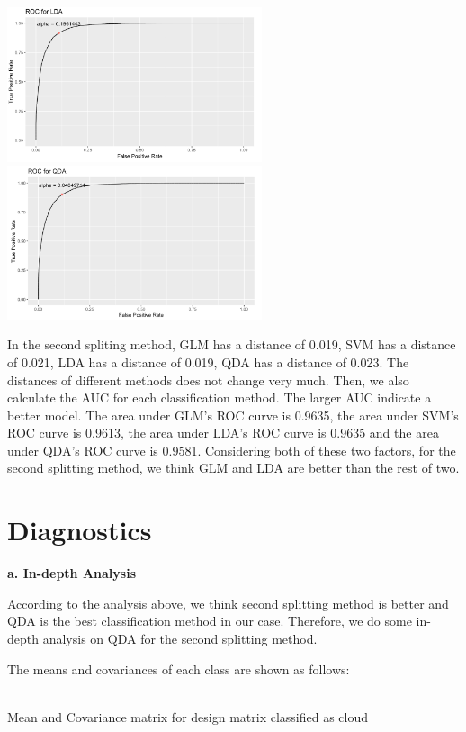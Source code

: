 \documentclass[11pt]{article}
\begin{document}
\includegraphics[width = 7.5cm]{3(b)2-3}
\includegraphics[width = 7.5cm]{3(b)2-4}

In the second spliting method, GLM has a distance of 0.019, SVM has a distance of 0.021, LDA has a distance of 0.019, QDA has a distance of 0.023. The distances of different methods does not change very much. Then, we also calculate the AUC for each classification method. The larger AUC indicate a better model. The area under GLM's ROC curve is 0.9635, the area under SVM's ROC curve is 0.9613, the area under LDA's ROC curve is 0.9635 and the area under QDA's ROC curve is 0.9581. Considering both of these two factors, for the second splitting method, we think GLM and LDA are better than the rest of two.



\section{Diagnostics}

\vspace{0.2cm}
\textbf{a. In-depth Analysis}

According to the analysis above, we think second splitting method is better and QDA is the best classification method in our case. Therefore, we do some in-depth analysis on QDA for the second splitting method.

The means and covariances of each class are shown as follows:

\mbox{}\\
Mean and Covariance matrix for design matrix classified as cloud
\end{document}
